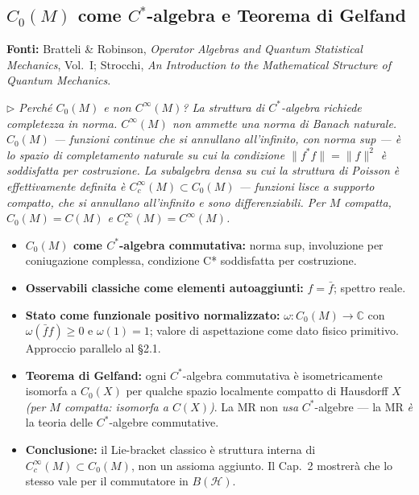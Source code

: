 \documentclass[12pt, a4paper]{article}
\newcommand{\fonti}[1]{%
	\begin{fontebox}
		\textcolor{fontecolor}{\footnotesize\textbf{Fonti:} #1}
	\end{fontebox}%
}
\newcommand{\nota}[1]{%
	\par\smallskip
	\noindent\textit{\small $\triangleright$\; #1}
	\par\smallskip
}
\begin{document}
	\subsection{$C_0(M)$ come $C^*$-algebra e Teorema di Gelfand}
	
	\fonti{Bratteli \& Robinson, \textit{Operator Algebras and Quantum Statistical
			Mechanics}, Vol.~I; Strocchi, \textit{An Introduction to the Mathematical
			Structure of Quantum Mechanics}.}
	
	\nota{Perché $C_0(M)$ e non $C^\infty(M)$? La struttura di $C^*$-algebra richiede
		completezza in norma. $C^\infty(M)$ non ammette una norma di Banach naturale.
		$C_0(M)$ --- funzioni continue che si annullano all'infinito, con norma sup ---
		è lo spazio di completamento naturale su cui la condizione $\|f^*f\|=\|f\|^2$
		è soddisfatta per costruzione. La subalgebra densa su cui la struttura di Poisson
		è effettivamente definita è $C^\infty_c(M)\subset C_0(M)$ --- funzioni lisce a
		supporto compatto, che si annullano all'infinito e sono differenziabili.
		Per $M$ compatta, $C_0(M)=C(M)$ e $C^\infty_c(M)=C^\infty(M)$.}
	
	\begin{itemize}
		\item \textbf{$C_0(M)$ come $C^*$-algebra commutativa:} norma sup, involuzione per
		coniugazione complessa, condizione C* soddisfatta per costruzione.
		\item \textbf{Osservabili classiche come elementi autoaggiunti:} $f=\bar f$;
		spettro reale.
		\item \textbf{Stato come funzionale positivo normalizzato:} $\omega:C_0(M)\to
		\mathbb{C}$ con $\omega(\bar ff)\geq 0$ e $\omega(1)=1$; valore di aspettazione
		come dato fisico primitivo. Approccio parallelo al \S2.1.
		\item \textbf{Teorema di Gelfand:} ogni $C^*$-algebra commutativa è isometricamente
		isomorfa a $C_0(X)$ per qualche spazio localmente compatto di Hausdorff $X$
		\emph{(per $M$ compatta: isomorfa a $C(X)$)}. La MR non \emph{usa}
		$C^*$-algebre --- la MR \emph{è} la teoria delle $C^*$-algebre commutative.
		\item \textbf{Conclusione:} il Lie-bracket classico è struttura interna di
		$C^\infty_c(M)\subset C_0(M)$, non un assioma aggiunto. Il Cap.~2 mostrerà che
		lo stesso vale per il commutatore in $B(\mathcal{H})$.
	\end{itemize}
	
\end{document}
